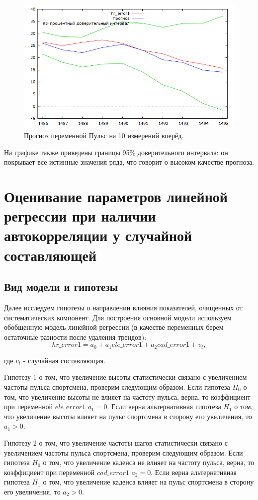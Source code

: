 \documentclass[a4paper,12pt]{article}
\begin{document}
\begin{figure}[H]
	\centering
	\includegraphics[width=0.5\linewidth]{../[graphics]/forecast.png}
	\caption{Прогноз переменной Пульс на 10 измерений вперёд.}
	\label{fig:forecast}
\end{figure}

На графике также приведены границы 95\% доверительного интервала: он покрывает все истинные значения ряда, что говорит о высоком качестве прогноза.

\section{Оценивание параметров линейной регрессии при наличии автокорреляции у случайной составляющей}

\subsection{Вид модели и гипотезы}
Далее исследуем гипотезы о направлении влияния показателей, очищенных от систематических компонент. Для построения основной модели используем обобщенную модель линейной регрессии (в качестве переменных берем остаточные разности после удаления трендов):
\[hr\_error1 = a_0 + a_1 ele\_error1 + a_2 cad\_error1 + v_t,\]

где $v_t$ - случайная составляющая.

Гипотезу 1 о том, что увеличение высоты статистически связано с увеличением частоты пульса спортсмена, проверим следующим образом. Если гипотеза $H_0$ о том, что увеличение высоты не влияет на частоту пульса, верна, то коэффициент при переменной $ele\_error1$ $a_1 = 0$. Если верна альтернативная гипотеза $H_1$ о том, что увеличение высоты влияет на пульс спортсмена в сторону его увеличения, то $a_1 > 0$.

Гипотезу 2 о том, что увеличение частоты шагов статистически связано с увеличением частоты пульса спортсмена, проверим следующим образом. Если гипотеза $H_0$ о том, что увеличение каденса не влияет на частоту пульса, верна, то коэффициент при переменной $cad\_error1$ $a_2 = 0$. Если верна альтернативная гипотеза $H_1$ о том, что увеличение каденса влияет на пульс спортсмена в сторону его увеличения, то $a_2 > 0$.
\end{document}
